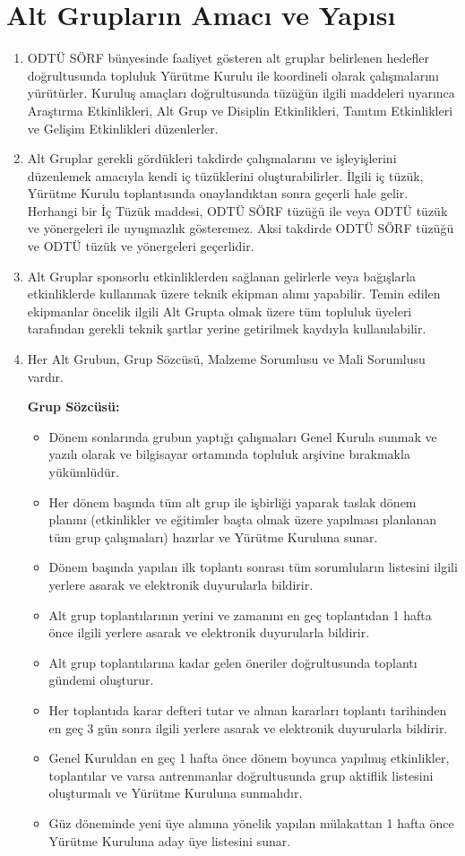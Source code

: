\documentclass[11pt,a4paper]{article}
\begin{document}
\section{Alt Grupların Amacı ve Yapısı}
\begin{enumerate}
    \item ODTÜ SÖRF bünyesinde faaliyet gösteren alt gruplar belirlenen hedefler doğrultusunda topluluk Yürütme Kurulu ile koordineli olarak çalışmalarını yürütürler. Kuruluş amaçları doğrultusunda tüzüğün ilgili maddeleri uyarınca Araştırma Etkinlikleri, Alt Grup ve Disiplin Etkinlikleri, Tanıtım Etkinlikleri ve Gelişim Etkinlikleri düzenlerler.
    \item Alt Gruplar gerekli gördükleri takdirde çalışmalarını ve işleyişlerini düzenlemek amacıyla kendi iç tüzüklerini oluşturabilirler. İlgili iç tüzük, Yürütme Kurulu toplantısında onaylandıktan sonra geçerli hale gelir. Herhangi bir İç Tüzük maddesi, ODTÜ SÖRF tüzüğü ile veya ODTÜ tüzük ve yönergeleri ile uyuşmazlık gösteremez. Aksi takdirde ODTÜ SÖRF tüzüğü ve ODTÜ tüzük ve yönergeleri geçerlidir.
    \item Alt Gruplar sponsorlu etkinliklerden sağlanan gelirlerle veya bağışlarla etkinliklerde kullanmak üzere teknik ekipman alımı yapabilir. Temin edilen ekipmanlar öncelik ilgili Alt Grupta olmak üzere tüm topluluk üyeleri tarafından gerekli teknik şartlar yerine getirilmek kaydıyla kullanılabilir.
    \item Her Alt Grubun, Grup Sözcüsü, Malzeme Sorumlusu ve Mali Sorumlusu vardır.
    
    \textbf{Grup Sözcüsü:}
    \begin{itemize}
        \item Dönem sonlarında grubun yaptığı çalışmaları Genel Kurula sunmak ve yazılı olarak ve bilgisayar ortamında topluluk arşivine bırakmakla yükümlüdür.
        \item Her dönem başında tüm alt grup ile işbirliği yaparak taslak dönem planını (etkinlikler ve eğitimler başta olmak üzere yapılması planlanan tüm grup çalışmaları) hazırlar ve Yürütme Kuruluna sunar.
        \item Dönem başında yapılan ilk toplantı sonrası tüm sorumluların listesini ilgili yerlere asarak ve elektronik duyurularla bildirir.
        \item Alt grup toplantılarının yerini ve zamanını en geç toplantıdan 1 hafta önce ilgili yerlere asarak ve elektronik duyurularla bildirir.
        \item Alt grup toplantılarına kadar gelen öneriler doğrultusunda toplantı gündemi oluşturur.
        \item Her toplantıda karar defteri tutar ve alınan kararları toplantı tarihinden en geç 3 gün sonra ilgili yerlere asarak ve elektronik duyurularla bildirir.
        \item Genel Kuruldan en geç 1 hafta önce dönem boyunca yapılmış etkinlikler, toplantılar ve varsa antrenmanlar doğrultusunda grup aktiflik listesini oluşturmalı ve Yürütme Kuruluna sunmalıdır.
        \item Güz döneminde yeni üye alımına yönelik yapılan mülakattan 1 hafta önce Yürütme Kuruluna aday üye listesini sunar.
    \end{itemize}
    

\end{enumerate}
\end{document}
